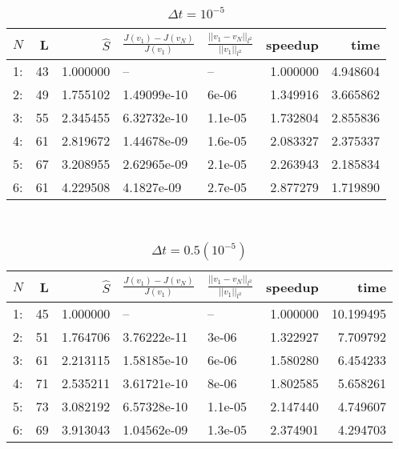 \begin{table}[h]
\centering
\caption{$\Delta t = 10^{-5}$}
\label{actual_speedup_1}
\begin{tabular}{lrrllrr}
\toprule
{} $N$&   L &        $\hat S$ &          $\frac{J(v_1)-J(v_N)}{J(v_1)}$ &    $\frac{||v_1-v_N||_{l^2}}{||v_1||_{l^2}}$&   speedup &      time \\
\midrule
1: &  43 &  1.000000 &           -- &       -- &  1.000000 &  4.948604 \\
2: &  49 &  1.755102 &  1.49099e-10 &    6e-06 &  1.349916 &  3.665862 \\
3: &  55 &  2.345455 &  6.32732e-10 &  1.1e-05 &  1.732804 &  2.855836 \\
4: &  61 &  2.819672 &  1.44678e-09 &  1.6e-05 &  2.083327 &  2.375337 \\
5: &  67 &  3.208955 &  2.62965e-09 &  2.1e-05 &  2.263943 &  2.185834 \\
6: &  61 &  4.229508 &   4.1827e-09 &  2.7e-05 &  2.877279 &  1.719890 \\
\bottomrule
\end{tabular}
\end{table}
\\
\begin{table}[h]
\centering
\caption{$\Delta t = 0.5(10^{-5})$}
\label{actual_speedup_2}
\begin{tabular}{lrrllrr}
\toprule
{} $N$&   L &        $\hat S$ &         $\frac{J(v_1)-J(v_N)}{J(v_1)}$ &    $\frac{||v_1-v_N||_{l^2}}{||v_1||_{l^2}}$&speedup &       time \\
\midrule
1: &  45 &  1.000000 &           -- &       -- &  1.000000 &  10.199495 \\
2: &  51 &  1.764706 &  3.76222e-11 &    3e-06 &  1.322927 &   7.709792 \\
3: &  61 &  2.213115 &  1.58185e-10 &    6e-06 &  1.580280 &   6.454233 \\
4: &  71 &  2.535211 &  3.61721e-10 &    8e-06 &  1.802585 &   5.658261 \\
5: &  73 &  3.082192 &  6.57328e-10 &  1.1e-05 &  2.147440 &   4.749607 \\
6: &  69 &  3.913043 &  1.04562e-09 &  1.3e-05 &  2.374901 &   4.294703 \\
\bottomrule
\end{tabular}
\end{table}
\\
